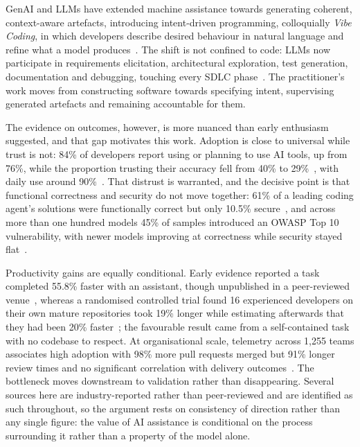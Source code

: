 \label{chap:intro}

\ac{GenAI} and \acp{LLM} have extended machine assistance towards generating coherent, context-aware artefacts, introducing intent-driven programming, colloquially \emph{Vibe Coding}, in which developers describe desired behaviour in natural language and refine what a model produces~\cite{Moore:2025vc, Zamfiroiu:2025ec}. The shift is not confined to code: \acp{LLM} now participate in requirements elicitation, architectural exploration, test generation, documentation and debugging, touching every \ac{SDLC} phase~\cite{Ahmed:2025ai, Zhang:2025ea, Hou:2025cl}. The practitioner's work moves from constructing software towards specifying intent, supervising generated artefacts and remaining accountable for them.

\label{sec:motivation}%
The evidence on outcomes, however, is more nuanced than early enthusiasm suggested, and that gap motivates this work. Adoption is close to universal while trust is not: 84\% of developers report using or planning to use AI tools, up from 76\%, while the proportion trusting their accuracy fell from 40\% to 29\%~\cite{StackOverflow:2025dev}, with daily use around 90\%~\cite{DORA:2025ai}. That distrust is warranted, and the decisive point is that functional correctness and security do not move together: 61\% of a leading coding agent's solutions were functionally correct but only 10.5\% secure~\cite{Zhao:2025vibe}, and across more than one hundred models 45\% of samples introduced an OWASP Top 10 vulnerability, with newer models improving at correctness while security stayed flat~\cite{Veracode:2025gen}.

Productivity gains are equally conditional. Early evidence reported a task completed 55.8\% faster with an assistant, though unpublished in a peer-reviewed venue~\cite{Peng:2023cop}, whereas a randomised controlled trial found 16 experienced developers on their own mature repositories took 19\% longer while estimating afterwards that they had been 20\% faster~\cite{Becker:2025rct}; the favourable result came from a self-contained task with no codebase to respect. At organisational scale, telemetry across 1,255 teams associates high adoption with 98\% more pull requests merged but 91\% longer review times and no significant correlation with delivery outcomes~\cite{Faros:2025par}. The bottleneck moves downstream to validation rather than disappearing. Several sources here are industry-reported rather than peer-reviewed and are identified as such throughout, so the argument rests on consistency of direction rather than any single figure: the value of AI assistance is conditional on the process surrounding it rather than a property of the model alone.

